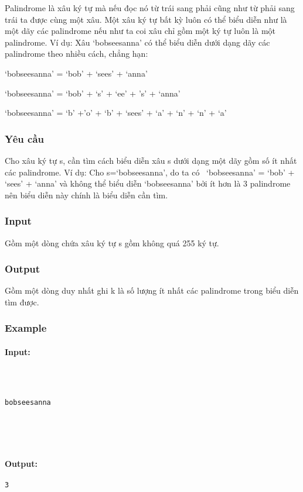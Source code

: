 



   Palindrome là xâu ký tự mà nếu đọc nó từ trái sang phải cũng như từ phải sang trái ta được cùng một xâu. Một xâu ký tự bất kỳ luôn có thể biểu diễn như là một dãy các palindrome nếu như ta coi xâu chỉ gồm một ký tự luôn là một palindrome. Ví dụ: Xâu ‘bobseesanna’ có thể biểu diễn dưới dạng dãy các palindrome theo nhiều cách, chẳng hạn:  

   ‘bobseesanna’ = ‘bob’ + ‘sees’ + ‘anna’  

   ‘bobseesanna’ = ‘bob’ + ‘s’ + ‘ee’ + ’s’ + ‘anna’  

   ‘bobseesanna’ = ‘b’ +’o’ + ‘b’ + ‘sees’ + ‘a’ + ‘n’ + ‘n’ + ‘a’  

\subsubsection{   Yêu cầu  }

   Cho xâu ký tự s, cần tìm cách biểu diễn xâu s dưới dạng một dãy gồm số ít nhất các palindrome. Ví dụ: Cho s=‘bobseesanna’, do ta có  ‘bobseesanna’ = ‘bob’ + ‘sees’ + ‘anna’ và không thể biểu diễn ‘bobseesanna’ bởi ít hơn là 3 palindrome nên biểu diễn này chính là biểu diễn cần tìm.  

\subsubsection{   Input  }

   Gồm một dòng chứa xâu ký tự s gồm không quá 255 ký tự.  

\subsubsection{   Output  }

   Gồm một dòng duy nhất ghi k là số lượng ít nhất các palindrome trong biểu diễn tìm được.  

\subsubsection{   Example  }

\paragraph{\textbf{    Input:   }}
\begin{verbatim}



bobseesanna





\end{verbatim}

\paragraph{   Output:  }
\begin{verbatim}
3\end{verbatim}
